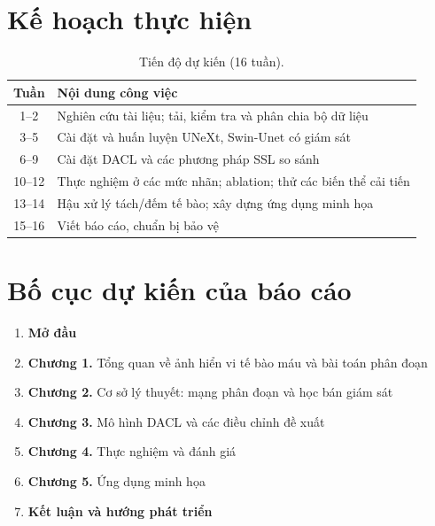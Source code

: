 \documentclass[12pt,a4paper]{article}
\begin{document}
\section{Kế hoạch thực hiện}

\begin{table}[ht]
\centering
\caption{Tiến độ dự kiến (16 tuần).}
\begin{tabularx}{\textwidth}{c X}
\toprule
Tuần & Nội dung công việc \\
\midrule
1--2   & Nghiên cứu tài liệu; tải, kiểm tra và phân chia bộ dữ liệu \\
3--5   & Cài đặt và huấn luyện UNeXt, Swin-Unet có giám sát \\
6--9   & Cài đặt DACL và các phương pháp SSL so sánh \\
10--12 & Thực nghiệm ở các mức nhãn; ablation; thử các biến thể cải tiến \\
13--14 & Hậu xử lý tách/đếm tế bào; xây dựng ứng dụng minh họa \\
15--16 & Viết báo cáo, chuẩn bị bảo vệ \\
\bottomrule
\end{tabularx}
\end{table}

\section{Bố cục dự kiến của báo cáo}
\begin{enumerate}
  \item[] \textbf{Mở đầu}
  \item[] \textbf{Chương 1.} Tổng quan về ảnh hiển vi tế bào máu và bài toán phân đoạn
  \item[] \textbf{Chương 2.} Cơ sở lý thuyết: mạng phân đoạn và học bán giám sát
  \item[] \textbf{Chương 3.} Mô hình DACL và các điều chỉnh đề xuất
  \item[] \textbf{Chương 4.} Thực nghiệm và đánh giá
  \item[] \textbf{Chương 5.} Ứng dụng minh họa
  \item[] \textbf{Kết luận và hướng phát triển}
\end{enumerate}



\end{document}
